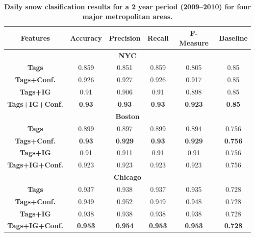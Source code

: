 \begin{table}[b!] 
 \caption {\textbf{ Daily snow clasification results for a 2 year period (2009--2010) for four major metropolitan areas.}}
\label{tab:classifiers_snowcities} 
\begin{center}
{\small{
\newcommand{\spc}{\hspace{2pt}}
\begin{tabular} {|@{\spc}c@{\spc}|@{\spc}c@{\spc}|@{\spc}c@{\spc}|@{\spc}c@{\spc}|@{\spc}c@{\spc}|@{\spc}c@{\spc}|} %
\hline 
 \textbf{Features} & \textbf{Accuracy}  &  \textbf{Precision} & \textbf{Recall}&  \textbf{F-Measure}  &\textbf{Baseline} \tabularnewline
\hline 
%
\multicolumn{6}{|c|}{\textbf{NYC} } \\ %
\hline
\textbf{Tags} & 0.859  &     0.851 &    0.859 &    0.805 &0.85 \\   %
\hline 
\textbf{Tags+Conf.} &0.926 &   0.927 &    0.926   &  0.917 &0.85\\ %
\hline
\textbf{Tags+IG} & 0.91   &    0.906 &    0.91  &    0.898 &0.85  \\ %
\hline 
\textbf{Tags+IG+Conf.}& \textbf{0.93}   & \textbf{ 0.93}  &  \textbf{  0.93}  &  \textbf{  0.923} &\textbf{0.85}  \\ %

\hline
 \multicolumn{6}{|c|}{\textbf{Boston}}  \\ %
\hline

 \textbf{Tags} &0.899 & 0.897  & 0.899  &   0.894  & 0.756  \\   %
\hline 
\textbf{Tags+Conf.} &\textbf{0.93}  &\textbf{ 0.929}  &  \textbf{ 0.93} & \textbf{0.929} &\textbf{0.756} \\ %
\hline
\textbf{Tags+IG} &  0.91    &   0.911  &   0.91 &     0.91 &0.756  \\ %
\hline 
\textbf{Tags+IG+Conf.} & 0.923     &   0.923   &  0.923  &   0.923 &0.756 \\ %
\hline 

 \multicolumn{6}{|c|}{\textbf{Chicago}}  \\ %
\hline
\textbf{Tags} &0.937  & 0.938&     0.937 &    0.935 &0.728 \\   %
\hline 
\textbf{Tags+Conf.} &0.949 &       0.952  &   0.949 &    0.948 &0.728  \\ %
\hline
\textbf{Tags+IG} &  0.938  &  0.938 &    0.938   &  0.938 &0.728 \\ %
\hline 
\textbf{Tags+IG+Conf.} & \textbf{0.953}  & \textbf{0.954}  & \textbf{0.953}  & \textbf{0.953}  &\textbf{0.728} \\ %



\end{tabular}}}
\end{center}
\end{table}

